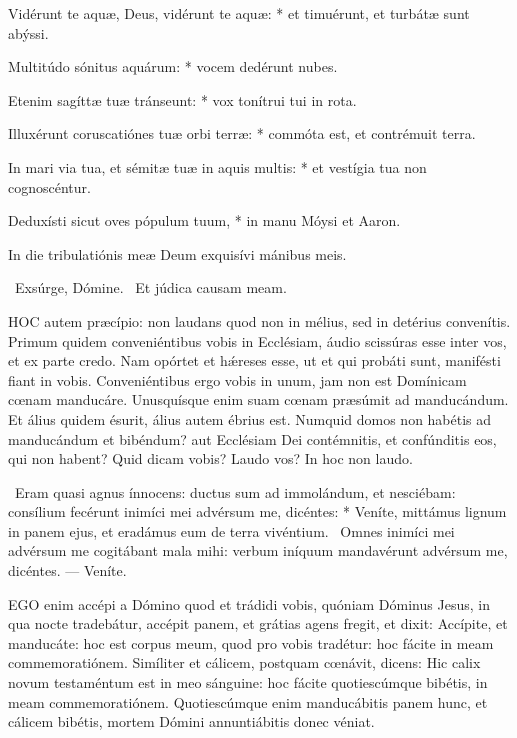 Vidérunt te aquæ, Deus, vidérunt te aquæ: * et timuérunt, et turbátæ sunt abýssi.

Multitúdo sónitus aquárum: * vocem dedérunt nubes.

Etenim sagíttæ tuæ tránseunt: * vox tonítrui tui in rota.

Illuxérunt coruscatiónes tuæ orbi terræ: * commóta est, et contrémuit terra.

In mari via tua, et sémitæ tuæ in aquis multis: * et vestígia tua non cognoscéntur.

Deduxísti sicut oves pópulum tuum, * in manu Móysi et Aaron.

\rubric{\textdagger}

 In die tribulatiónis meæ Deum exquisívi mánibus meis.

\V\ Exsúrge, Dómine. \R\ Et júdica causam meam.




\lettrine[lines=2]{H}{OC} autem præcípio: non laudans quod non in mélius, sed in detérius convenítis. Primum quidem conveniéntibus vobis in Ecclésiam, áudio scissúras esse inter vos, et ex parte credo. Nam opórtet et hǽreses esse, ut et qui probáti sunt, manifésti fiant in vobis. Conveniéntibus ergo vobis in unum, jam non est Domínicam cœnam manducáre. Unusquísque enim suam cœnam præsúmit ad manducándum. Et álius quidem ésurit, álius autem ébrius est. Numquid domos non habétis ad manducándum et bibéndum? aut Ecclésiam Dei contémnitis, et confúnditis eos, qui non habent? Quid dicam vobis? Laudo vos? In hoc non laudo.

\R\ Eram quasi agnus ínnocens: ductus sum ad immolándum, et nesciébam: consílium fecérunt inimíci mei advérsum me, dicéntes: * Veníte, mittámus lignum in panem ejus, et eradámus eum de terra vivéntium. \V\ Omnes inimíci mei advérsum me cogitábant mala mihi: verbum iníquum mandavérunt advérsum me, dicéntes. --- Veníte.


\lettrine[lines=2]{E}{GO} enim accépi a Dómino quod et trádidi vobis, quóniam Dóminus Jesus, in qua nocte tradebátur, accépit panem, et grátias agens fregit, et dixit: Accípite, et manducáte: hoc est corpus meum, quod pro vobis tradétur: hoc fácite in meam commemoratiónem. Simíliter et cálicem, postquam cœnávit, dicens: Hic calix novum testaméntum est in meo sánguine: hoc fácite quotiescúmque bibétis, in meam commemoratiónem. Quotiescúmque enim manducábitis panem hunc, et cálicem bibétis, mortem Dómini annuntiábitis donec véniat.

